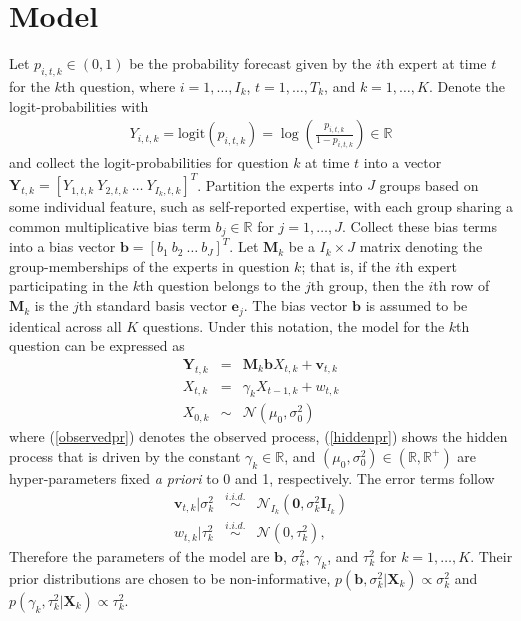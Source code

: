 \documentclass[aoas, preprint]{imsart}
\numberwithin{equation}{section}
\theoremstyle{plain}
\newcommand{\R}{\mathbb{R}}
\newcommand{\logit}{\text{logit}}
\begin{document}
\section{Model}
\label{model}
Let $p_{i,t,k} \in (0,1)$ be the probability forecast given by the $i$th expert at time $t$ for the $k$th question, where $i = 1, \dots, I_k$, $t = 1, \dots, T_k$, and $k = 1, \dots, K$. Denote the logit-probabilities with 
\begin{eqnarray*}
Y_{i,t,k} = \logit(p_{i,t,k}) = \log \left( \frac{p_{i,t,k}}{1-p_{i,t,k}}\right) \in \R
\end{eqnarray*}
and collect the logit-probabilities for question $k$ at time $t$ into a vector $\boldsymbol{Y}_{t,k} = [Y_{1,t,k}\ Y_{2,t,k}\ \dots\ Y_{I_{k},t,k}]^T$. Partition the experts into $J$ groups based on some individual feature, such as self-reported expertise, with each group sharing a common multiplicative bias term $b_{j} \in \R$ for $j = 1, \dots, J$. Collect these bias terms into a bias vector $\boldsymbol{b} = [b_{1}\ b_{2}\ \dots\ b_{J}]^T$. Let $\boldsymbol{M}_k$ be a $I_k \times J$ matrix denoting  the group-memberships of the experts in question $k$; that is, if the $i$th expert participating in the $k$th question belongs to the $j$th group, then the $i$th row of $\boldsymbol{M}_k$ is the $j$th standard basis vector $\boldsymbol{e}_j$. The bias vector $\boldsymbol{b}$ is assumed to be identical across all $K$ questions.  Under this notation, the model for the $k$th question can be expressed as 
\begin{eqnarray}
\boldsymbol{Y}_{t, k} &=&  \boldsymbol{M}_k \boldsymbol{b} X_{t, k} + \boldsymbol{v}_{t, k} \label{observedpr} \\
X_{t, k} &=& \gamma_k X_{t-1, k} + w_{t, k} \label{hiddenpr}\\
X_{0,k} &\sim& \mathcal{N}(\mu_0, \sigma^2_0) \nonumber
\end{eqnarray}
where (\ref{observedpr}) denotes the observed process, (\ref{hiddenpr}) shows the hidden process that is driven by the constant $\gamma_k \in \R$, and $(\mu_0, \sigma_0^2) \in (\R, \R^+)$ are hyper-parameters fixed \textit{a priori} to 0 and 1, respectively. The error terms follow
\begin{eqnarray*}
\boldsymbol{v}_{t, k} | \sigma^2_k &\stackrel{i.i.d.}{\sim}& \mathcal{N}_{I_k}(\boldsymbol{0}, \sigma^2_k \boldsymbol{I}_{I_k})\\
w_{t, k} | \tau^2_k &\stackrel{i.i.d.}{\sim}& \mathcal{N}(0, \tau^2_k),
\end{eqnarray*}
Therefore the parameters of the model are $\boldsymbol{b}$, $\sigma^2_k$, $\gamma_k$, and $\tau^2_k$ for $k = 1, \dots, K$. Their prior distributions are chosen to be non-informative,  $p(\boldsymbol{b}, \sigma^2_k| \boldsymbol{X}_k) \propto \sigma^2_k$ and $p(\gamma_k, \tau^2_k| \boldsymbol{X}_k) \propto \tau^2_k$. 
\end{document}
